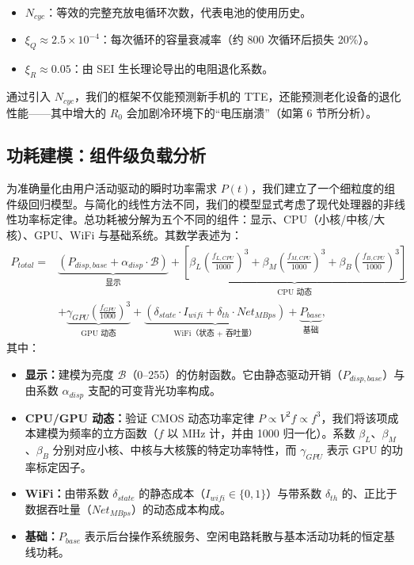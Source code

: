 \documentclass[11pt,a4paper]{ctexart}
\begin{document}
\begin{itemize}[leftmargin=1.6em,itemsep=0.2em]
\item $N_{cyc}$：等效的完整充放电循环次数，代表电池的使用历史。
\item $\xi_Q\approx 2.5\times 10^{-4}$：每次循环的容量衰减率（约 800 次循环后损失 20\%）。
\item $\xi_R\approx 0.05$：由 SEI 生长理论导出的电阻退化系数。
\end{itemize}

通过引入 $N_{cyc}$，我们的框架不仅能预测新手机的 TTE，还能预测老化设备的退化性能——其中增大的 $R_0$ 会加剧冷环境下的“电压崩溃”（如第 6 节所分析）。

\subsection{功耗建模：组件级负载分析}

为准确量化由用户活动驱动的瞬时功率需求 $P(t)$，我们建立了一个细粒度的组件级回归模型。与简化的线性方法不同，我们的模型显式考虑了现代处理器的非线性功率标定律。总功耗被分解为五个不同的组件：显示、CPU（小核/中核/大核）、GPU、WiFi 与基础系统。其数学表述为：
\begin{equation}
\begin{aligned}
P_{total} = {} & \underbrace{\left(P_{disp,base}+\alpha_{disp}\cdot\mathcal{B}\right)}_{\text{显示}}
+ \underbrace{\left[\beta_L\left(\frac{f_{L,CPU}}{1000}\right)^3+\beta_M\left(\frac{f_{M,CPU}}{1000}\right)^3+\beta_B\left(\frac{f_{B,CPU}}{1000}\right)^3\right]}_{\text{CPU 动态}}\\
& + \underbrace{\gamma_{GPU}\left(\frac{f_{GPU}}{1000}\right)^3}_{\text{GPU 动态}}
+ \underbrace{\left(\delta_{state}\cdot I_{wifi}+\delta_{th}\cdot Net_{MBps}\right)}_{\text{WiFi（状态 + 吞吐量）}}
+ \underbrace{P_{base}}_{\text{基础}} ,
\end{aligned}
\end{equation}
其中：

\begin{itemize}[leftmargin=1.6em,itemsep=0.2em]
\item \textbf{显示：}建模为亮度 $\mathcal{B}$（0--255）的仿射函数。它由静态驱动开销（$P_{disp,base}$）与由系数 $\alpha_{disp}$ 支配的可变背光功率构成。
\item \textbf{CPU/GPU 动态：}验证 CMOS 动态功率定律 $P\propto V^2f\propto f^3$，我们将该项成本建模为频率的立方函数（$f$ 以 MHz 计，并由 1000 归一化）。系数 $\beta_L$、$\beta_M$、$\beta_B$ 分别对应小核、中核与大核簇的特定功率特性，而 $\gamma_{GPU}$ 表示 GPU 的功率标定因子。
\item \textbf{WiFi：}由带系数 $\delta_{state}$ 的静态成本（$I_{wifi}\in\{0,1\}$）与带系数 $\delta_{th}$ 的、正比于数据吞吐量（$Net_{MBps}$）的动态成本构成。
\item \textbf{基础：}$P_{base}$ 表示后台操作系统服务、空闲电路耗散与基本活动功耗的恒定基线功耗。
\end{itemize}
\end{document}

